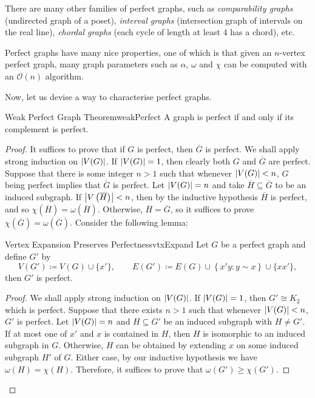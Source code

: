 \documentclass[math, code]{amznotes}
\theoremstyle{remark}
\begin{document}
There are many other families of perfect graphs, such as \textit{comparability graphs}
(undirected graph of a poset), \textit{interval graphs} (intersection graph of intervals on the real
line), \textit{chordal graphs} (each cycle of length at least $4$ has a chord), etc.

Perfect graphs have many nice properties, one of which is that given an $n$-vertex perfect graph, many graph parameters such as $\alpha$, $\omega$ and $\chi$ can be computed with an $\mathcal{O}(n)$ algorithm. 

Now, let us devise a way to characterise perfect graphs.
\begin{thmbox}{Weak Perfect Graph Theorem}{weakPerfect}
    A graph is perfect if and only if its complement is perfect.
    \tcblower
    \begin{proof}
        It suffices to prove that if $G$ is perfect, then $\overline{G}$ is perfect. We shall apply strong induction on ${\left\lvert {V(G)} \right\rvert}$. If ${\left\lvert {V(G)} \right\rvert} = 1$, then clearly both $G$ and $\overline{G}$ are perfect. Suppose that there is some integer $n > 1$ such that whenever ${\left\lvert {V(G)} \right\rvert} < n$, $G$ being perfect implies that $\overline{G}$ is perfect. Let ${\left\lvert {V(G)} \right\rvert} = n$ and take $\overline{H} \subseteq \overline{G}$ to be an induced subgraph. If ${\left\lvert {V\left(\overline{H}\right)} \right\rvert} < n$, then by the inductive hypothesis $\overline{H}$ is perfect, and so $\chi\left(\overline{H}\right) = \omega\left(\overline{H}\right)$. Otherwise, $\overline{H} = \overline{G}$, so it suffices to prove $\chi\left(\overline{G}\right) = \omega\left(\overline{G}\right)$. Consider the following lemma:
        \begin{lembox}{Vertex Expansion Preserves Perfectness}{vtxExpand}
            Let $G$ be a perfect graph and define $G'$ by 
            \begin{equation*}
                V(G') \coloneqq V(G) \cup \{x'\}, \qquad E(G') \coloneqq E(G) \cup \left\{x'y \colon y \sim x\right\} \cup \{xx'\},
            \end{equation*}
            then $G'$ is perfect.
            \tcblower
            \begin{proof}
                We shall apply strong induction on ${\left\lvert {V(G)} \right\rvert}$. If ${\left\lvert {V(G)} \right\rvert} = 1$, then $G' \cong K_2$ which is perfect. Suppose that there exists $n > 1$ such that whenever ${\left\lvert {V(G)} \right\rvert} < n$, $G'$ is perfect. Let ${\left\lvert {V(G)} \right\rvert} = n$ and $H \subseteq G'$ be an induced subgraph with $H \neq G'$. If at most one of $x'$ and $x$ is contained in $H$, then $H$ is isomorphic to an induced subgraph in $G$. Otherwise, $H$ can be obtained by extending $x$ on some induced subgraph $H'$ of $G$.  Either case, by our inductive hypothesis we have $\omega(H) = \chi(H)$. Therefore, it suffices to prove that $\omega(G') \geq \chi(G')$.

\end{proof}
\end{lembox}
\end{proof}
\end{thmbox}
\end{document}
